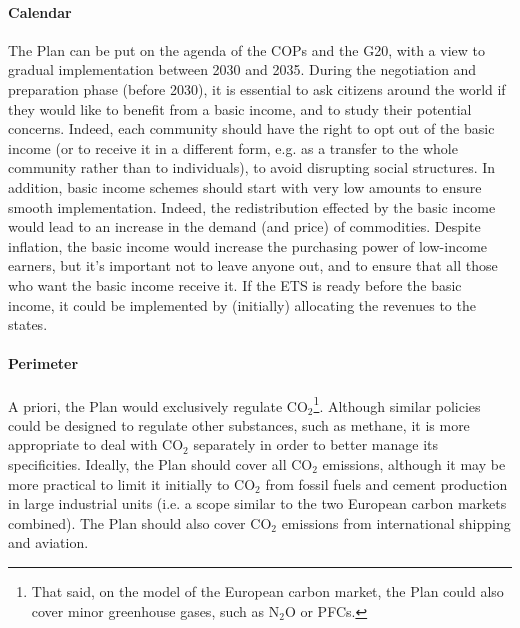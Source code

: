 \documentclass[a5paper,french,openany]{memoir}
\begin{document}
{\paragraph{Calendar} 
The Plan can be put on the agenda of the COPs and the G20, with a view to gradual implementation between 2030 and 2035. During the negotiation and preparation phase (before 2030), it is essential to ask citizens around the world if they would like to benefit from a basic income, and to study their potential concerns. Indeed, each community should have the right to opt out of the basic income (or to receive it in a different form, e.g. as a transfer to the whole community rather than to individuals), to avoid disrupting social structures. In addition, basic income schemes should start with very low amounts to ensure smooth implementation. Indeed, the redistribution effected by the basic income would lead to an increase in the demand (and price) of commodities. Despite inflation, the basic income would increase the purchasing power of low-income earners, but it's important not to leave anyone out, and to ensure that all those who want the basic income receive it. If the ETS is ready before the basic income, it could be implemented by (initially) allocating the revenues to the states.

\paragraph{Perimeter} 
A priori, the Plan would exclusively regulate CO$_\text{2}$\footnote{That said, on the model of the European carbon market, the Plan could also cover minor greenhouse gases, such as N$_\text{2}$O or PFCs.}. Although similar policies could be designed to regulate other substances, such as methane, it is more appropriate to deal with CO$_\text{2}$ separately in order to better manage its specificities. Ideally, the Plan should cover all CO$_\text{2}$ emissions, although it may be more practical to limit it initially to CO$_\text{2}$ from fossil fuels and cement production in large industrial units (i.e. a scope similar to the two European carbon markets combined). The Plan should also cover CO$_\text{2}$ emissions from international shipping and aviation. 

}
\end{document}
